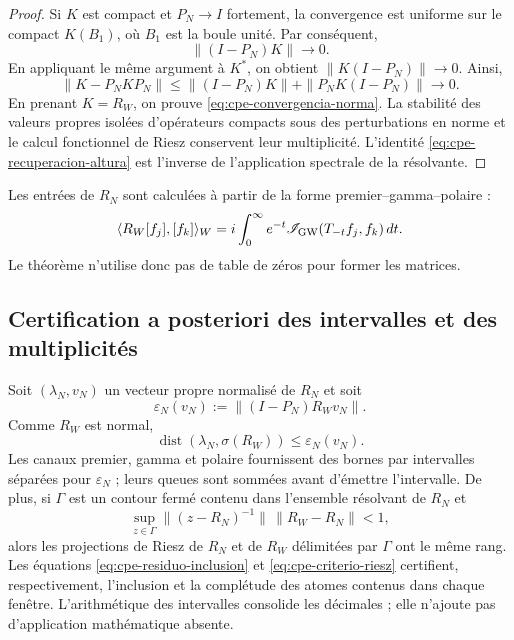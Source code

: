 \begin{proof}
Si \(K\) est compact et \(P_N\to I\) fortement, la convergence est uniforme
sur le compact \(K(B_1)\), où \(B_1\) est la boule unité. Par conséquent,
\[
 \|(I-P_N)K\|\longrightarrow0.
\]
En appliquant le même argument à \(K^*\), on obtient
\(\|K(I-P_N)\|\to0\). Ainsi,
\[
 \|K-P_NKP_N\|
 \leq\|(I-P_N)K\|+\|P_NK(I-P_N)\|\longrightarrow0.
\]
En prenant \(K=R_W\), on prouve \eqref{eq:cpe-convergencia-norma}. La
stabilité des valeurs propres isolées d'opérateurs compacts sous des
perturbations en norme et le calcul fonctionnel de Riesz conservent leur
multiplicité. L'identité \eqref{eq:cpe-recuperacion-altura} est l'inverse
de l'application spectrale de la résolvante.
\end{proof}

Les entrées de \(R_N\) sont calculées à partir de la forme premier--gamma--polaire :
\[
 \langle R_W[f_j],[f_k]\rangle_W
 =i\int_0^\infty e^{-t}
 \mathscr I_{\rm GW}(T_{-t}f_j,f_k)\,dt.
\]
Le théorème n'utilise donc pas de table de zéros pour former les matrices.

\subsection{Certification a posteriori des intervalles et des multiplicités}

Soit \((\lambda_N,v_N)\) un vecteur propre normalisé de \(R_N\) et soit
\[
 \varepsilon_N(v_N)
 :=\|(I-P_N)R_Wv_N\|.
\]
Comme \(R_W\) est normal,
\begin{equation}
 \operatorname{dist}(\lambda_N,\sigma(R_W))
 \leq\varepsilon_N(v_N).
 \label{eq:cpe-residuo-inclusion}
\end{equation}
Les canaux premier, gamma et polaire fournissent des bornes par intervalles séparées
pour \(\varepsilon_N\) ; leurs queues sont sommées avant d'émettre l'intervalle.
De plus, si \(\Gamma\) est un contour fermé contenu dans l'ensemble résolvant de
\(R_N\) et
\begin{equation}
 \sup_{z\in\Gamma}
 \|(z-R_N)^{-1}\|\,\|R_W-R_N\|<1,
 \label{eq:cpe-criterio-riesz}
\end{equation}
alors les projections de Riesz de \(R_N\) et de \(R_W\) délimitées par
\(\Gamma\) ont le même rang. Les équations
\eqref{eq:cpe-residuo-inclusion} et \eqref{eq:cpe-criterio-riesz} certifient,
respectivement, l'inclusion et la complétude des atomes contenus dans chaque
fenêtre. L'arithmétique des intervalles consolide les décimales ; elle n'ajoute pas d'application
mathématique absente.

